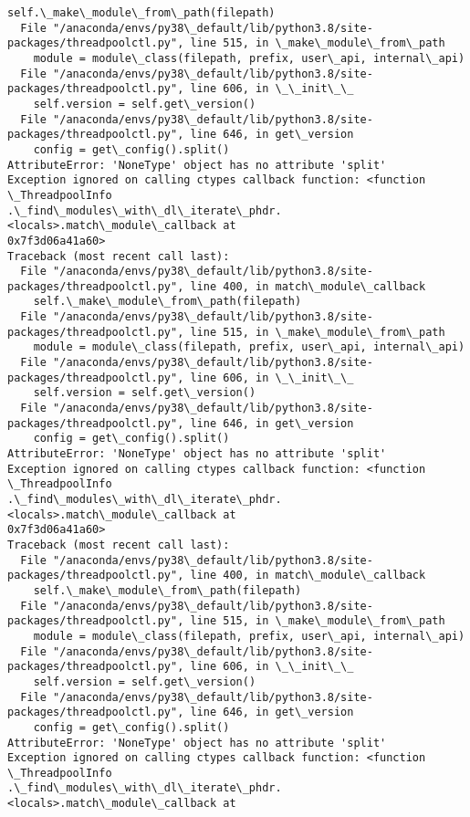 \documentclass[11pt]{article}
\begin{document}
\begin{Verbatim}[commandchars=\\\{\}]
    self.\_make\_module\_from\_path(filepath)
  File "/anaconda/envs/py38\_default/lib/python3.8/site-
packages/threadpoolctl.py", line 515, in \_make\_module\_from\_path
    module = module\_class(filepath, prefix, user\_api, internal\_api)
  File "/anaconda/envs/py38\_default/lib/python3.8/site-
packages/threadpoolctl.py", line 606, in \_\_init\_\_
    self.version = self.get\_version()
  File "/anaconda/envs/py38\_default/lib/python3.8/site-
packages/threadpoolctl.py", line 646, in get\_version
    config = get\_config().split()
AttributeError: 'NoneType' object has no attribute 'split'
Exception ignored on calling ctypes callback function: <function \_ThreadpoolInfo
.\_find\_modules\_with\_dl\_iterate\_phdr.<locals>.match\_module\_callback at
0x7f3d06a41a60>
Traceback (most recent call last):
  File "/anaconda/envs/py38\_default/lib/python3.8/site-
packages/threadpoolctl.py", line 400, in match\_module\_callback
    self.\_make\_module\_from\_path(filepath)
  File "/anaconda/envs/py38\_default/lib/python3.8/site-
packages/threadpoolctl.py", line 515, in \_make\_module\_from\_path
    module = module\_class(filepath, prefix, user\_api, internal\_api)
  File "/anaconda/envs/py38\_default/lib/python3.8/site-
packages/threadpoolctl.py", line 606, in \_\_init\_\_
    self.version = self.get\_version()
  File "/anaconda/envs/py38\_default/lib/python3.8/site-
packages/threadpoolctl.py", line 646, in get\_version
    config = get\_config().split()
AttributeError: 'NoneType' object has no attribute 'split'
Exception ignored on calling ctypes callback function: <function \_ThreadpoolInfo
.\_find\_modules\_with\_dl\_iterate\_phdr.<locals>.match\_module\_callback at
0x7f3d06a41a60>
Traceback (most recent call last):
  File "/anaconda/envs/py38\_default/lib/python3.8/site-
packages/threadpoolctl.py", line 400, in match\_module\_callback
    self.\_make\_module\_from\_path(filepath)
  File "/anaconda/envs/py38\_default/lib/python3.8/site-
packages/threadpoolctl.py", line 515, in \_make\_module\_from\_path
    module = module\_class(filepath, prefix, user\_api, internal\_api)
  File "/anaconda/envs/py38\_default/lib/python3.8/site-
packages/threadpoolctl.py", line 606, in \_\_init\_\_
    self.version = self.get\_version()
  File "/anaconda/envs/py38\_default/lib/python3.8/site-
packages/threadpoolctl.py", line 646, in get\_version
    config = get\_config().split()
AttributeError: 'NoneType' object has no attribute 'split'
Exception ignored on calling ctypes callback function: <function \_ThreadpoolInfo
.\_find\_modules\_with\_dl\_iterate\_phdr.<locals>.match\_module\_callback at

\end{Verbatim}
\end{document}
